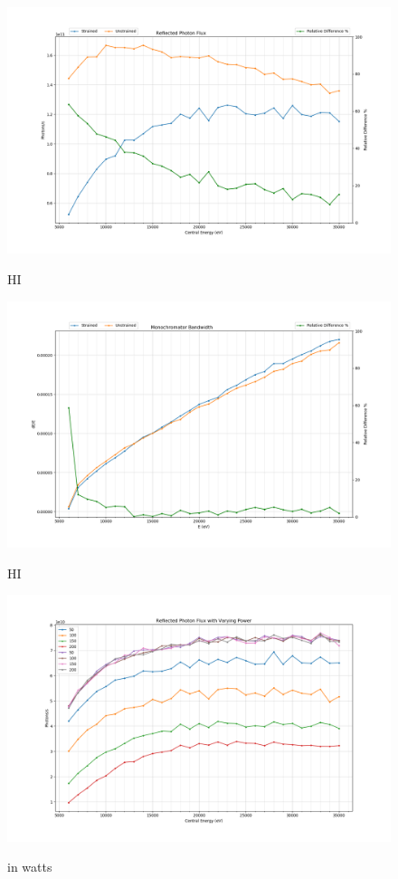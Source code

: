 \documentclass[preprint]{iucr}              %
\begin{document}
\begin{figure}
\caption{HI}
\includegraphics{images/333flux.png}
\label{fig:333flux}
\end{figure}

\begin{figure}
\caption{HI}
\includegraphics{images/333monobw.png}
\label{fig:333monobw}
\end{figure}

\begin{figure}
\caption{in watts}
\includegraphics{images/333strainpower.png}
\label{fig:333strainpower}
\end{figure}
\end{document}
